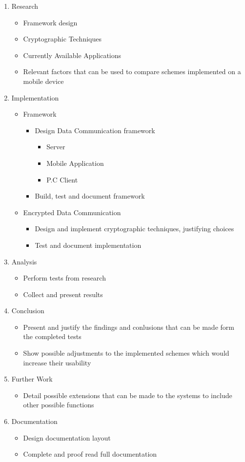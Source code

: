 \documentclass[a4paper,11pt]{article}
\begin{document}
\begin{enumerate}
  \item Research
  \begin{itemize}
    \item Framework design
    \item Cryptographic Techniques
    \item Currently Available Applications
    \item Relevant factors that can be used to compare schemes implemented on a mobile device
  \end{itemize}
  \item Implementation
  \begin{itemize}
    \item Framework
    \begin{itemize} 
      \item Design Data Communication framework
      \begin{itemize}
        \item Server
        \item Mobile Application
        \item P.C Client
      \end{itemize}
      \item Build, test and document framework
    \end{itemize}
  \item Encrypted Data Communication
  \begin{itemize}
    \item Design and implement cryptographic techniques, justifying choices
    \item Test and document implementation
  \end{itemize}
  \end{itemize}
  \item Analysis
  \begin{itemize}
    \item Perform tests from research
    \item Collect and present results
  \end{itemize}
  \item Conclusion
  \begin{itemize}
    \item Present and justify the findings and conlusions that can be made form the completed tests
    \item Show possible adjustments to the implemented schemes which would increase their usability
  \end{itemize}
  \item Further Work
  \begin{itemize}
    \item Detail possible extensions that can be made to the systems to include other possible functions
  \end{itemize}
  \item Documentation
  \begin{itemize}
    \item Design documentation layout
    \item Complete and proof read full documentation
  \end{itemize}
\end{enumerate}
\end{document}

